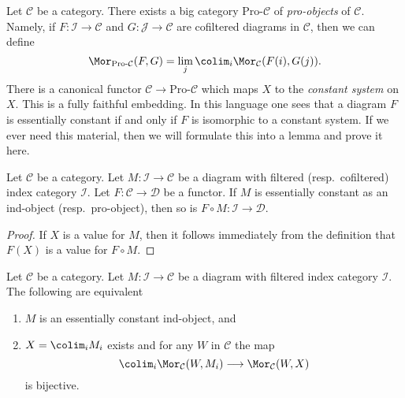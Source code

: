 \begin{remark}
\label{remark-pro-category}
Let $\mathcal{C}$ be a category. There exists a big category
$\text{Pro-}\mathcal{C}$ of {\it pro-objects} of $\mathcal{C}$.
Namely, if $F : \mathcal{I} \to \mathcal{C}$ and
$G : \mathcal{J} \to \mathcal{C}$ are cofiltered diagrams in $\mathcal{C}$,
then we can define
$$
\Mor_{\text{Pro-}\mathcal{C}}(F, G) =
\lim_j \colim_i \Mor_\mathcal{C}(F(i), G(j)).
$$
There is a canonical functor $\mathcal{C} \to \text{Pro-}\mathcal{C}$
which maps $X$ to the {\it constant system} on $X$. This is a fully
faithful embedding. In this language one sees that a diagram $F$ is
essentially constant if and only if $F$ is isomorphic to a constant system.
If we ever need this material, then we will formulate this into a lemma
and prove it here.
\end{remark}

\begin{lemma}
\label{lemma-image-essentially-constant}
Let $\mathcal{C}$ be a category. Let $M : \mathcal{I} \to \mathcal{C}$
be a diagram with filtered (resp.\ cofiltered) index category $\mathcal{I}$.
Let $F : \mathcal{C} \to \mathcal{D}$ be a functor.
If $M$ is essentially constant as an ind-object (resp.\ pro-object),
then so is $F \circ M : \mathcal{I} \to \mathcal{D}$.
\end{lemma}

\begin{proof}
If $X$ is a value for $M$, then it follows immediately from the
definition that $F(X)$ is a value for $F \circ M$.
\end{proof}

\begin{lemma}
\label{lemma-characterize-essentially-constant-ind}
Let $\mathcal{C}$ be a category. Let $M : \mathcal{I} \to \mathcal{C}$
be a diagram with filtered index category $\mathcal{I}$.
The following are equivalent
\begin{enumerate}
\item $M$ is an essentially constant ind-object, and
\item $X = \colim_i M_i$ exists and for any $W$ in $\mathcal{C}$
the map
$$
\colim_i \Mor_\mathcal{C}(W, M_i) \longrightarrow
\Mor_\mathcal{C}(W, X)
$$
is bijective.
\end{enumerate}
\end{lemma}

